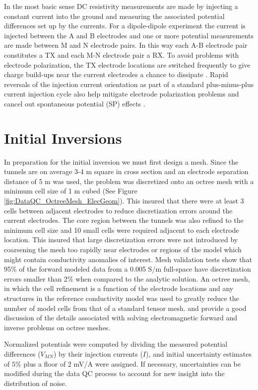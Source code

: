 \documentclass[final,authoryear,5p,times,twocolumn]{elsarticle}
\begin{document}
In the most basic sense DC resistivity measurements are made by injecting a constant current into the ground and measuring the associated potential differences set up by the currents. For a dipole-dipole experiment the current is injected between the A and B electrodes and one or more potential measurements are made between M and N electrode pairs. In this way each A-B electrode pair constitutes a TX and each M-N electrode pair a RX. To avoid problems with electrode polarization, the TX electrode locations are switched frequently to give charge build-ups near the current electrodes a chance to dissipate \citep{Dahlin2000}. Rapid reversals of the injection current orientation as part of a standard plus-minus-plus current injection cycle also help mitigate electrode polarization problems and cancel out spontaneous potential (SP) effects \citep{Telford1990, Dahlin2000}.

\section{Initial Inversions}
\label{Initial_Inv}
In preparation for the initial inversion we must first design a mesh. Since the tunnels are on average 3-4 m square in cross section and an electrode separation distance of 5 m was used, the problem was discretized onto an octree mesh with a minimum cell size of 1 m cubed (See Figure \ref{fig:DataQC_OctreeMesh_ElecGeom}). This insured that there were at least 3 cells between adjacent electrodes to reduce discretization errors around the current electrodes. The core region between the tunnels was also refined to the minimum cell size and 10 small cells were required adjacent to each electrode location. This insured that large discretization errors were not introduced by coarsening the mesh too rapidly near electrodes or regions of the model which might contain conductivity anomalies of interest. Mesh validation tests show that 95$\%$ of the forward modeled data from a 0.005 S/m full-space have discretization errors smaller than 2$\%$ when compared to the analytic solution. An octree mesh, in which the cell refinement is a function of the electrode locations and any structures in the reference conductivity model was used to greatly reduce the number of model cells from that of a standard tensor mesh. \cite{Haber2007} and \cite{Haber2012} provide a good discussion of the details associated with solving electromagnetic forward and inverse problems on octree meshes. 

Normalized potentials were computed by dividing the measured potential differences ($V_{MN}$) by their injection currents ($I$), and initial uncertainty estimates of $5\%$ plus a floor of 2 mV/A were assigned. If necessary, uncertainties can be modified during the data QC process to account for new insight into the distribution of noise.  
 
\end{document}

